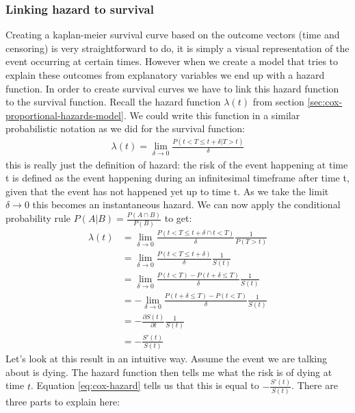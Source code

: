 \subsubsection{Linking hazard to survival}
Creating a kaplan-meier survival curve based on the outcome vectors (time and censoring) is very straightforward to do, it is simply a visual representation of the event occurring at certain times. However when we create a model that tries to explain these outcomes from explanatory variables we end up with a hazard function. In order to create survival curves we have to link this hazard function to the survival function\cite{survivalmodels}. Recall the hazard function $\lambda(t)$ from section \ref{sec:cox-proportional-hazards-model}. We could write this function in a similar probabilistic notation as we did for the survival function:
\begin{equation}
\begin{split}
\lambda(t) = \lim\limits_{\delta\rightarrow0}\frac{P(t < T \leq t+\delta | T  > t)}{\delta}
\end{split}
\end{equation}
this is really just the definition of hazard: the risk of the event happening at time t is defined as the event happening during an infinitesimal timeframe after time t, given that the event has not happened yet up to time t. As we take the limit $\delta\rightarrow0$ this becomes an instantaneous hazard. We can now apply the conditional probability rule $P(A|B) = \frac{P(A \cap B)}{P(B)}$ to get:
\begin{equation}
\begin{split}
\label{eq:cox-hazard}
\lambda(t) &= \lim\limits_{\delta\rightarrow0}\frac{P(t < T \leq t+\delta \cap t < T)}{\delta}\frac{1}{P(T>t)} \\
&= \lim\limits_{\delta\rightarrow0}\frac{P(t < T \leq t+\delta)}{\delta}\frac{1}{S(t)} \\
&= \lim\limits_{\delta\rightarrow0}\frac{P(t < T) - P(t+\delta\leq T)}{\delta}\frac{1}{S(t)} \\
&= -\lim\limits_{\delta\rightarrow0}\frac{P(t+\delta\leq T) - P(t < T)}{\delta}\frac{1}{S(t)} \\
&= -\frac{\partial S(t)}{\partial t}\frac{1}{S(t)} \\
&= -\frac{S'(t)}{S(t)}
\end{split}
\end{equation}
Let's look at this result in an intuitive way. Assume the event we are talking about is dying. The hazard function then tells me what the risk is of dying at time $t$. Equation \ref{eq:cox-hazard} tells us that this is equal to $-\frac{S'(t)}{S(t)}$. There are three parts to explain here:
